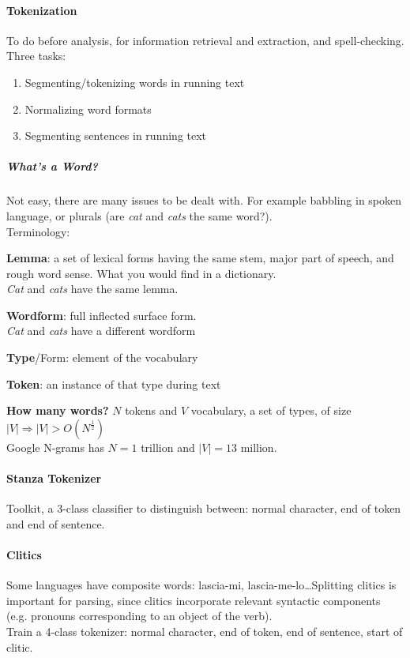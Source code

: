 \documentclass[10pt]{report}
\begin{document}
\paragraph{Tokenization} To do before analysis, for information retrieval and extraction, and spell-checking. Three tasks:\begin{enumerate}	
	\item Segmenting/tokenizing words in running text
	\item Normalizing word formats
	\item Segmenting sentences in running text
\end{enumerate}
\subparagraph{What's a Word?} Not easy, there are many issues to be dealt with. For example babbling in spoken language, or plurals (are \textit{cat} and \textit{cats} the same word?).\\
Terminology:
\begin{list}{}{}
	\item \textbf{Lemma}: a set of lexical forms having the same stem, major part of speech, and rough word sense. What you would find in a dictionary.\\
	\textit{Cat} and \textit{cats} have the same lemma.
	\item \textbf{Wordform}: full inflected surface form.\\
	\textit{Cat} and \textit{cats} have a different wordform
	\item \textbf{Type}/Form: element of the vocabulary
	\item \textbf{Token}: an instance of that type during text
\end{list}
\textbf{How many words?} $N$ tokens and $V$ vocabulary, a set of types, of size $|V| \Rightarrow |V| > O(N^{\frac{1}{2}})$\\
Google N-grams has $N = 1$ trillion and $|V| = 13$ million.
\paragraph{Stanza Tokenizer} Toolkit, a 3-class classifier to distinguish between: normal character, end of token and end of sentence.
\paragraph{Clitics} Some languages have composite words: lascia-mi, lascia-me-lo\ldots Splitting clitics is important for parsing, since clitics incorporate relevant syntactic components (e.g. pronouns corresponding to an object of the verb).\\
Train a 4-class tokenizer: normal character, end of token, end of sentence, start of clitic.
\end{document}

